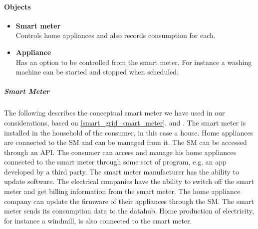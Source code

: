 \paragraph{Objects}
\begin{itemize}
\item \textbf{Smart meter}\\ Controls home appliances and also records consumption for each.
\item \textbf{Appliance}\\ Has an option to be controlled from the smart meter. For instance a washing machine can be started and stopped when scheduled.
\end{itemize}

\subparagraph{Smart Meter}
The following describes the conceptual smart meter we have used in our considerations, based on \cref{smart_grid_smart_meter}, \citet{tdlm} and \citet{smart_meter_survey}.
The smart meter is installed in the household of the consumer, in this case a house.
Home appliances are connected to the SM and can be managed from it.
The SM can be accessed through an API.
The consumer can access and manage his home appliances connected to the smart meter through some sort of program, e.g. an app developed by a third party.
The smart meter manufacturer has the ability to update software.
The electrical companies have the ability to switch off the smart meter and get billing information from the smart meter.
The home appliance company can update the firmware of their appliances through the SM.
The smart meter sends its consumption data to the datahub.
Home production of electricity, for instance a windmill, is also connected to the smart meter.
